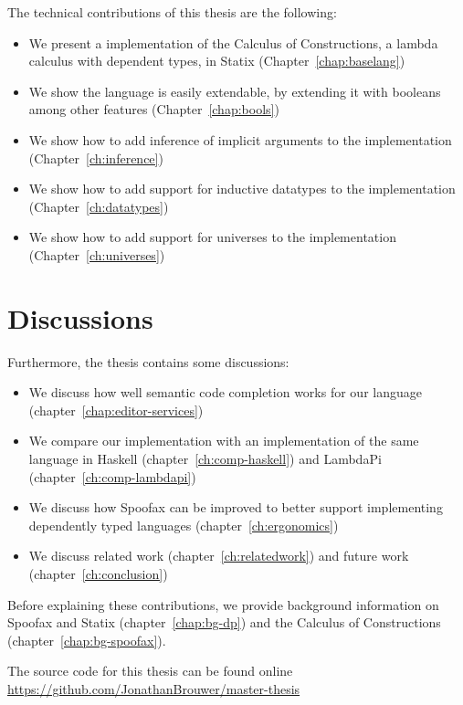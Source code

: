 The technical contributions of this thesis are the following:
\begin{itemize}
	\item We present a implementation of the Calculus of Constructions, a lambda calculus with dependent types, in Statix (Chapter~\ref{chap:baselang})
	\item We show the language is easily extendable, by extending it with booleans among other features (Chapter~\ref{chap:bools})
	\item We show how to add inference of implicit arguments to the implementation (Chapter~\ref{ch:inference})
	\item We show how to add support for inductive datatypes to the implementation (Chapter~\ref{ch:datatypes})
	\item We show how to add support for universes to the implementation (Chapter~\ref{ch:universes})
\end{itemize}

\section*{Discussions}

Furthermore, the thesis contains some discussions:
\begin{itemize}
	\item We discuss how well semantic code completion works for our language (chapter~\ref{chap:editor-services})
	\item We compare our implementation with an implementation of the same language in Haskell (chapter~\ref{ch:comp-haskell}) and LambdaPi (chapter~\ref{ch:comp-lambdapi})
	\item We discuss how Spoofax can be improved to better support implementing dependently typed languages (chapter~\ref{ch:ergonomics})
	\item We discuss related work (chapter~\ref{ch:relatedwork}) and future work (chapter~\ref{ch:conclusion})
\end{itemize}

\noindent Before explaining these contributions, we provide background information on Spoofax and Statix (chapter~\ref{chap:bg-dp}) and the Calculus of Constructions (chapter~\ref{chap:bg-spoofax}).

The source code for this thesis can be found online \\ \url{https://github.com/JonathanBrouwer/master-thesis}

